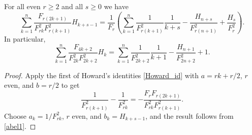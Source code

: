 \documentclass[12pt,reqno]{article}
\begin{document}
	\begin{theorem}\label{thm4_rec}
		For all even $r\geq 2$ and all $s\geq 0$ we have
		\begin{equation}\label{eq1_thm4_rec}
			\sum_{k=1}^n \frac{F_{r(2k+1)}}{F_{rk}^2 F_{r(k+1)}^2} H_{k+s-1} = \frac{1}{F_r} \left ( \sum_{k=1}^n \frac{1}{F_{r(k+1)}^2}\frac{1}{k+s}
			- \frac{H_{n+s}}{F_{r(n+1)}^2}  + \frac{H_s}{F_{r}^2} \right ).
		\end{equation}
		In particular,
		\begin{equation}
			\sum_{k=1}^n \frac{F_{4k+2}}{F_{2k}^2 F_{2k+2}^2} H_{k} = \sum_{k=1}^n \frac{1}{F_{2k+2}^2}\frac{1}{k+1} - \frac{H_{n+1}}{F_{2n+2}^2} +1.
		\end{equation}
	\end{theorem}
	\begin{proof}
		Apply the first of Howard's identities \eqref{Howard_id} with $a=rk+r/2$, $r$ even, and $b=r/2$ to get
		\begin{equation*}
			\frac{1}{F_{r(k+1)}^2} - \frac{1}{F_{rk}^2} = - \frac{F_r F_{r(2k+1)}}{F_{rk}^2 F_{r(k+1)}^2}.
		\end{equation*}
		Choose $a_k=1/F_{rk}^2$, $r$ even, and $b_k=H_{k+s-1}$, and the result follows from \eqref{abel1}.
	\end{proof}
	
\end{document}
